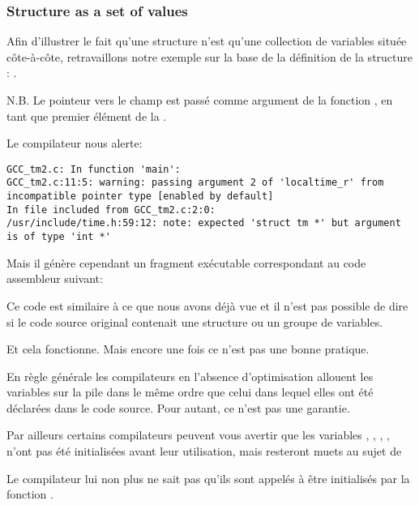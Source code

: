 ﻿\subsubsection{Structure as a set of values}

Afin d'illustrer le fait qu'une structure n'est qu'une collection de variables située côte-à-côte, 
retravaillons notre exemple sur la base de la définition de la structure : .



N.B. Le pointeur vers le champ  est passé comme argument de la fonction 
, en tant que premier élément de la .

Le compilateur nous alerte:

\begin{lstlisting}[caption=GCC 4.7.3]
GCC_tm2.c: In function 'main':
GCC_tm2.c:11:5: warning: passing argument 2 of 'localtime_r' from incompatible pointer type [enabled by default]
In file included from GCC_tm2.c:2:0:
/usr/include/time.h:59:12: note: expected 'struct tm *' but argument is of type 'int *'
\end{lstlisting}

Mais il génère cependant un fragment exécutable correspondant au code assembleur suivant:



Ce code est similaire à ce que nous avons déjà vue et il n'est pas possible de dire si le code 
source original contenait une structure ou un groupe de variables.

Et cela fonctionne. Mais encore une fois ce n'est pas une bonne pratique. 

En règle générale les compilateurs en l'absence d'optimisation allouent les variables sur la pile 
dans le même ordre que celui dans lequel elles ont été déclarées dans le code source. Pour autant, 
ce n'est pas une garantie.

Par ailleurs certains compilateurs peuvent vous avertir que les variables , 
, , ,  n'ont pas été initialisées avant leur 
utilisation, mais resteront muets au sujet de 

Le compilateur lui non plus ne sait pas qu'ils sont appelés à être initialisés par la fonction 
.

